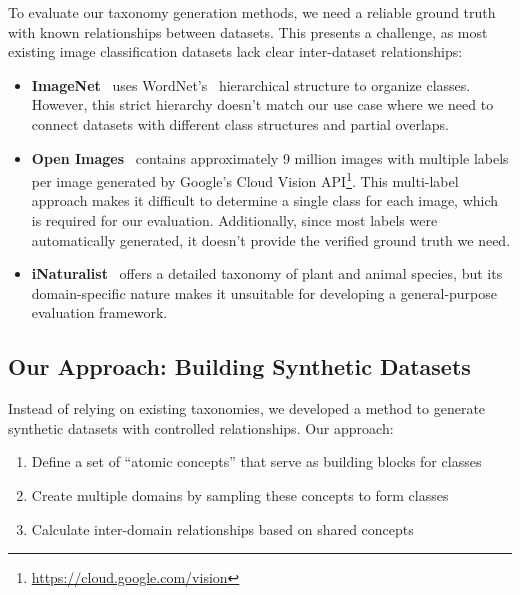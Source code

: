To evaluate our taxonomy generation methods, we need a reliable ground truth with known relationships between datasets. This presents a challenge, as most existing image classification datasets lack clear inter-dataset relationships:

\begin{itemize}
      \item \textbf{ImageNet}~\cite{deng_imagenet_2009,russakovsky_imagenet_2015}
            uses WordNet's~\cite{fellbaum_wordnet_1998} hierarchical structure to organize classes.
            However, this strict hierarchy doesn't match our use case where we need to connect
            datasets with different class structures and partial overlaps.

      \item \textbf{Open Images}~\cite{kuznetsova_open_2020} contains approximately 9 million
            images with multiple labels per image generated by Google's Cloud Vision API\footnote{\url{https://cloud.google.com/vision}}.
            This multi-label approach makes it difficult to determine a single class for each image,
            which is required for our evaluation. Additionally, since most labels were automatically
            generated, it doesn't provide the verified ground truth we need.

      \item \textbf{iNaturalist}~\cite{horn_inaturalist_2018} offers a detailed taxonomy of
            plant and animal species, but its domain-specific nature makes it unsuitable
            for developing a general-purpose evaluation framework.
\end{itemize}

\subsection{Our Approach: Building Synthetic Datasets}

Instead of relying on existing taxonomies, we developed a method to generate synthetic datasets with controlled relationships. Our approach:

\begin{enumerate}
      \item Define a set of \enquote{atomic concepts} that serve as building blocks for classes
      \item Create multiple domains by sampling these concepts to form classes
      \item Calculate inter-domain relationships based on shared concepts
\end{enumerate}

